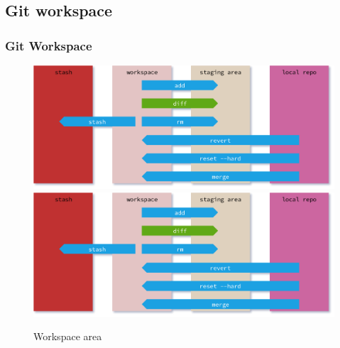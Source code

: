 \subsection*{Git workspace}
\begin{frame}[fragile]
    \frametitle{Git Workspace}
    \begin{figure}
        \begin{center}
            {
                \includegraphics[width=1\textwidth,keepaspectratio]{./images/GitAreas-Workspace.png}
            }
            {
                \includegraphics[height=0.75\textheight,keepaspectratio]{./images/GitAreas-Workspace.png}
            }
            \caption{Workspace area}
        \end{center}
    \end{figure}
\end{frame}


